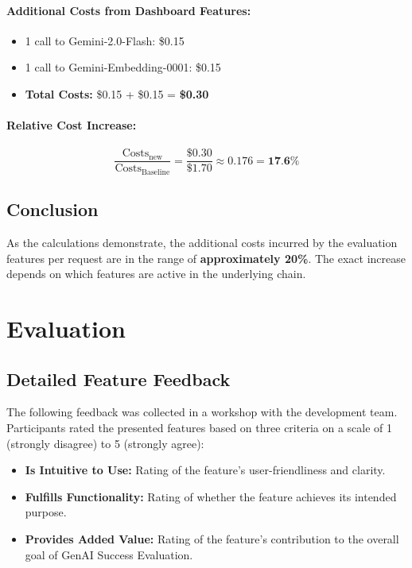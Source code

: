 \documentclass[
	english,
	ruledheaders=section,%
	class=report,%
	thesis={type=bachelor},%
	accentcolor=1b,%
	custommargins=true,%
	marginpar=false,%
	parskip=half-,%
	fontsize=11pt,%
	DIV=14,
]{tudapub}
\begin{document}
\paragraph{Additional Costs from Dashboard Features:}
\begin{itemize}
    \item 1 call to Gemini-2.0-Flash: \$0.15
    \item 1 call to Gemini-Embedding-0001: \$0.15
    \item \textbf{Total Costs:} \$0.15 + \$0.15 = \textbf{\$0.30}
\end{itemize}

\paragraph{Relative Cost Increase:}
\begin{equation*}
\frac{\text{Costs}_\text{new}}{\text{Costs}_\text{Baseline}} = \frac{\$0.30}{\$1.70} \approx 0.176 = \textbf{17.6\%}
\end{equation*}
\subsection*{Conclusion}
As the calculations demonstrate, the additional costs incurred by the evaluation features per request are in the range of \textbf{approximately 20\%}. The exact increase depends on which features are active in the underlying chain.
\section*{Evaluation}
\subsection*{Detailed Feature Feedback}

The following feedback was collected in a workshop with the development team. Participants rated the presented features based on three criteria on a scale of 1 (strongly disagree) to 5 (strongly agree):
\begin{itemize}
    \item \textbf{Is Intuitive to Use:} Rating of the feature's user-friendliness and clarity.
    \item \textbf{Fulfills Functionality:} Rating of whether the feature achieves its intended purpose.
    \item \textbf{Provides Added Value:} Rating of the feature's contribution to the overall goal of GenAI Success Evaluation.
\end{itemize}
\end{document}
